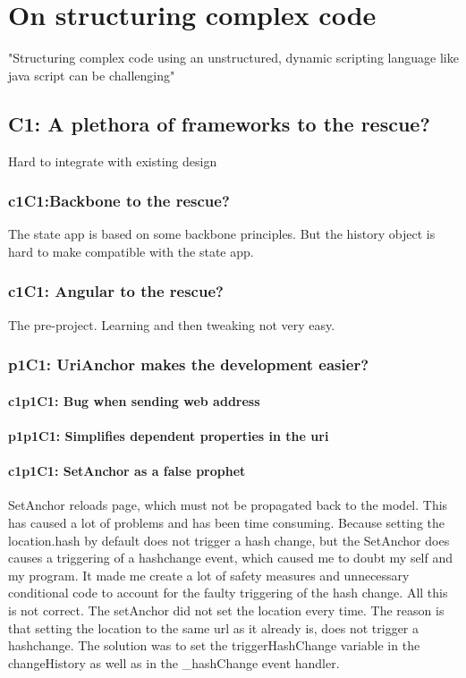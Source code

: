 \documentclass[english]{ifimaster}
\begin{document}
\chapter{On structuring complex code}
\label{sec:patterns}
"Structuring complex code using an unstructured, dynamic scripting language like java script can be challenging"
\section{C1: A plethora of frameworks to the rescue?}
Hard to integrate with existing design
\subsection{c1C1:Backbone to the rescue?}
The state app is based on some backbone principles. But the history object is hard to make compatible with the state app. 
\subsection{c1C1: Angular to the rescue?}
The pre-project. Learning and then tweaking not very easy.
\subsection{p1C1: UriAnchor makes the development easier?}
\subsubsection{c1p1C1: Bug when sending web address}
\subsubsection{p1p1C1: Simplifies dependent properties in the uri}
\subsubsection{c1p1C1: SetAnchor as a false prophet} 
SetAnchor reloads page, which must not be propagated back to the model. This has caused a lot of problems and has been time consuming. Because setting the location.hash by default does not trigger a hash change, but the SetAnchor does causes a triggering of a hashchange event, which caused me to doubt my self and my program. It made me create a lot of safety measures and unnecessary conditional code to account for the faulty triggering of the hash change. All this is not correct. The setAnchor did not set the location every time. The reason is that setting the location to the same url as it already is, does not trigger a hashchange. The solution was to set the triggerHashChange variable in the changeHistory as well as in the \_hashChange event handler.
\end{document}
